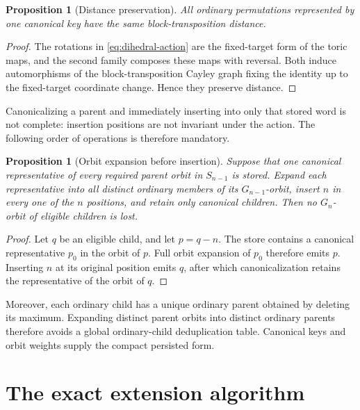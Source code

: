 \documentclass[11pt]{article}
\newtheorem{proposition}[theorem]{Proposition}
\theoremstyle{definition}
\theoremstyle{remark}
\begin{document}
\begin{proposition}[Distance preservation]
\label{prop:distance-preservation}
All ordinary permutations represented by one canonical key have the same
block-transposition distance.
\end{proposition}

\begin{proof}
The rotations in \eqref{eq:dihedral-action} are the fixed-target form of the toric maps,
and the second family composes these maps with reversal.  Both induce
automorphisms of the block-transposition Cayley graph fixing the identity up
to the fixed-target coordinate change.  Hence they preserve distance.
\end{proof}

Canonicalizing a parent and immediately inserting into only that stored word
is not complete: insertion positions are not invariant under the action.
The following order of operations is therefore mandatory.

\begin{proposition}[Orbit expansion before insertion]
\label{prop:orbit-expansion}
Suppose that one canonical representative of every required parent orbit in
$S_{n-1}$ is stored.  Expand each representative into all distinct ordinary
members of its $G_{n-1}$-orbit, insert $n$ in every one of the $n$ positions,
and retain only canonical children.  Then no $G_n$-orbit of eligible children
is lost.
\end{proposition}

\begin{proof}
Let $q$ be an eligible child, and let $p=q-n$.  The store contains a canonical
representative $p_0$ in the orbit of $p$.  Full orbit expansion of $p_0$
therefore emits $p$.  Inserting $n$ at its original position emits $q$, after
which canonicalization retains the representative of the orbit of $q$.
\end{proof}

Moreover, each ordinary child has a unique ordinary parent obtained by
deleting its maximum.  Expanding distinct parent orbits into distinct
ordinary parents therefore avoids a global ordinary-child deduplication
table.  Canonical keys and orbit weights supply the compact persisted form.

\section{The exact extension algorithm}
\label{sec:algorithm}
\end{document}
